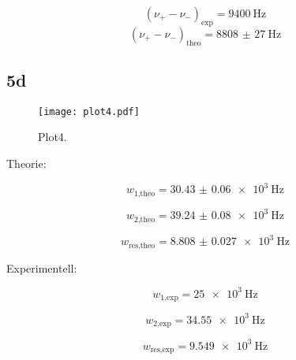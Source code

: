 \begin{equation}
  (\nu_{+}-\nu_{-})_{\text{exp}} = \SI{9400}{\hertz}
\end{equation}
\begin{equation}
  (\nu_{+}-\nu_{-})_{\text{theo}} = \SI{8808(27)}{\hertz}
\end{equation}

\subsection{5d}

\begin{figure}
  \centering
  \texttt{[image: plot4.pdf]}
  \caption{Plot4.}
  \label{fig:plot4}
\end{figure}


Theorie:

\begin{equation}
  w_{\text{1,theo}} = \SI{30.43(6)e3}{\hertz}
\end{equation}

\begin{equation}
  w_{\text{2,theo}} = \SI{39.24(8)e3}{\hertz}
\end{equation}

\begin{equation}
  w_{\text{res,theo}} = \SI{8.808(27)e3}{\hertz}
\end{equation}

Experimentell:

\begin{equation}
  w_{\text{1,exp}} = \SI{25e3}{\hertz}
\end{equation}

\begin{equation}
  w_{\text{2,exp}} = \SI{34.55e3}{\hertz}
\end{equation}

\begin{equation}
  w_{\text{res,exp}} = \SI{9.549e3}{\hertz}
\end{equation}

